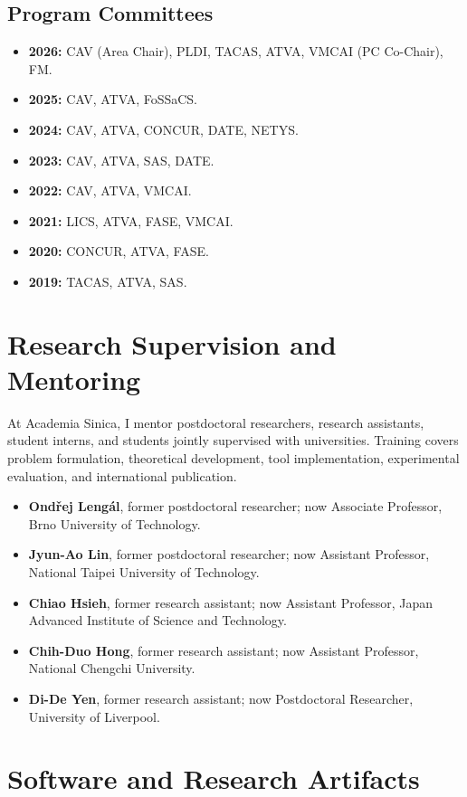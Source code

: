 \documentclass[11pt,a4paper]{article}
\begin{document}
\subsection*{Program Committees}
\begin{itemize}
  \item \textbf{2026:} CAV (Area Chair), PLDI, TACAS, ATVA, VMCAI (PC Co-Chair), FM.
  \item \textbf{2025:} CAV, ATVA, FoSSaCS.
  \item \textbf{2024:} CAV, ATVA, CONCUR, DATE, NETYS.
  \item \textbf{2023:} CAV, ATVA, SAS, DATE.
  \item \textbf{2022:} CAV, ATVA, VMCAI.
  \item \textbf{2021:} LICS, ATVA, FASE, VMCAI.
  \item \textbf{2020:} CONCUR, ATVA, FASE.
  \item \textbf{2019:} TACAS, ATVA, SAS.
\end{itemize}

\section{Research Supervision and Mentoring}

At Academia Sinica, I mentor postdoctoral researchers, research assistants,
student interns, and students jointly supervised with universities. Training
covers problem formulation, theoretical development, tool implementation,
experimental evaluation, and international publication.

\begin{itemize}
  \item \textbf{Ondřej Lengál}, former postdoctoral researcher; now Associate Professor, Brno University of Technology.
  \item \textbf{Jyun-Ao Lin}, former postdoctoral researcher; now Assistant Professor, National Taipei University of Technology.
  \item \textbf{Chiao Hsieh}, former research assistant; now Assistant Professor, Japan Advanced Institute of Science and Technology.
  \item \textbf{Chih-Duo Hong}, former research assistant; now Assistant Professor, National Chengchi University.
  \item \textbf{Di-De Yen}, former research assistant; now Postdoctoral Researcher, University of Liverpool.
\end{itemize}

\section{Software and Research Artifacts}
\end{document}
